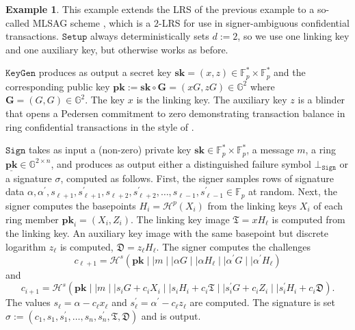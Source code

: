 \documentclass{mrl}
\theoremstyle{plain}
\theoremstyle{definition}
\newtheorem{example}{Example}[section]
\begin{document}
\begin{example}\label{ex:mlsag}
This example extends the LRS of the previous example to a so-called MLSAG scheme \cite{noether}, which is a $2$-LRS for use in signer-ambiguous confidential transactions. $\texttt{Setup}$ always deterministically sets $d := 2$, so we use one linking key and one auxiliary key, but otherwise works as before.

$\texttt{KeyGen}$ produces as output a secret key $\textbf{sk} = (x, z) \in \mathbb{F}_p^* \times \mathbb{F}_p^*$ and the corresponding public key  $\textbf{pk} := \textbf{sk} \circ \textbf{G} = (xG, zG) \in \mathbb{G}^2$ where $\textbf{G} = (G, G) \in \mathbb{G}^2$. The key $x$ is the linking key. The auxiliary key $z$ is a blinder that opens a Pedersen commitment to zero demonstrating transaction balance in ring confidential transactions in the style of \cite{noether}.

$\texttt{Sign}$ takes as input a (non-zero) private key $\textbf{sk} \in \mathbb{F}_p^* \times \mathbb{F}_p^*$, a message $m$, a ring $\underline{\textbf{pk}} \in \mathbb{G}^{2 \times n}$, and produces as output either a distinguished failure symbol $\bot_{\texttt{Sign}}$ or a signature $\sigma$, computed as follows. First, the signer samples rows of signature data  $\alpha, \alpha^\prime, s_{\ell + 1}, s^\prime_{\ell + 1}, s_{\ell + 2}, s^\prime_{\ell + 2}, \ldots, s_{\ell -1}, s^\prime_{\ell - 1} \in \mathbb{F}_p$ at random. Next, the signer computes the basepoints $H_i = \mathcal{H}^p(X_i)$ from the linking keys $X_i$ of each ring member $\textbf{pk}_i = (X_i, Z_i)$. The linking key image $\mathfrak{T} = x H_\ell$ is computed from the linking key. An auxiliary key image with the same basepoint but discrete logarithm $z_\ell$ is computed, $\mathfrak{D} = z_\ell H_\ell$. The signer computes the challenges
$$c_{\ell + 1} = \mathcal{H}^s(\textbf{pk} \mid \mid m \mid \mid \alpha G \mid \mid \alpha H_\ell \mid \mid \alpha^\prime G \mid \mid \alpha^\prime H_\ell)$$
and
$$c_{i+1} = \mathcal{H}^s(\textbf{pk} \mid \mid m \mid \mid s_i G + c_i X_i \mid \mid s_i H_i + c_i \mathfrak{T} \mid \mid s_i^\prime G + c_i Z_i \mid \mid s_i^\prime H_i + c_i \mathfrak{D}).$$
The values $s_\ell = \alpha - c_\ell x_\ell$ and $s_\ell^\prime = \alpha^\prime - c_\ell z_\ell$ are computed. The signature is set $\sigma := (c_1, s_1, s_1^\prime, \ldots, s_n, s_n^\prime, \mathfrak{T}, \mathfrak{D})$ and is output.


\end{example}
\end{document}
